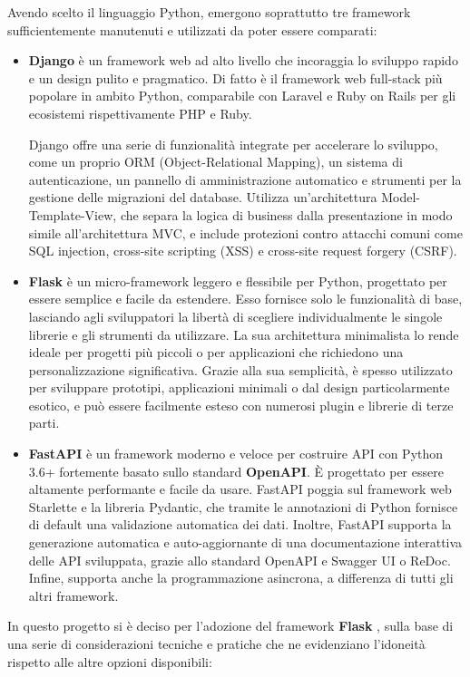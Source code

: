 Avendo scelto il linguaggio Python, emergono soprattutto tre framework sufficientemente manutenuti e utilizzati da poter essere comparati:
\begin{itemize}
    \item \textbf{Django} è un framework web ad alto livello che incoraggia lo sviluppo rapido e un design pulito e pragmatico. Di fatto è il framework web full-stack più popolare in ambito Python, comparabile con Laravel e Ruby on Rails per gli ecosistemi rispettivamente PHP e Ruby.
    
    Django offre una serie di funzionalità integrate per accelerare lo sviluppo, come un proprio ORM (Object-Relational Mapping), un sistema di autenticazione, un pannello di amministrazione automatico e strumenti per la gestione delle migrazioni del database. Utilizza un'architettura Model-Template-View, che separa la logica di business dalla presentazione in modo simile all'architettura MVC, e include protezioni contro attacchi comuni come SQL injection, cross-site scripting (XSS) e cross-site request forgery (CSRF).
    \item \textbf{Flask} è un micro-framework leggero e flessibile per Python, progettato per essere semplice e facile da estendere. Esso fornisce solo le funzionalità di base, lasciando agli sviluppatori la libertà di scegliere individualmente le singole librerie e gli strumenti da utilizzare. La sua architettura minimalista lo rende ideale per progetti più piccoli o per applicazioni che richiedono una personalizzazione significativa. Grazie alla sua semplicità, è spesso utilizzato per sviluppare prototipi, applicazioni minimali o dal design particolarmente esotico, e può essere facilmente esteso con numerosi plugin e librerie di terze parti.
    \item \textbf{FastAPI} è un framework moderno e veloce per costruire API con Python 3.6+ fortemente basato sullo standard \textbf{OpenAPI}. È progettato per essere altamente performante e facile da usare. FastAPI poggia sul framework web Starlette e la libreria Pydantic, che tramite le annotazioni di Python fornisce di default una validazione automatica dei dati. Inoltre, FastAPI supporta la generazione automatica e auto-aggiornante di una documentazione interattiva delle API sviluppata, grazie allo standard OpenAPI e Swagger UI o ReDoc. Infine, supporta anche la programmazione asincrona, a differenza di tutti gli altri framework.
\end{itemize}
In questo progetto si è deciso per l'adozione del framework \textbf{Flask} \cite{flask}, sulla base di una serie di considerazioni tecniche e pratiche che ne evidenziano l'idoneità rispetto alle altre opzioni disponibili:

